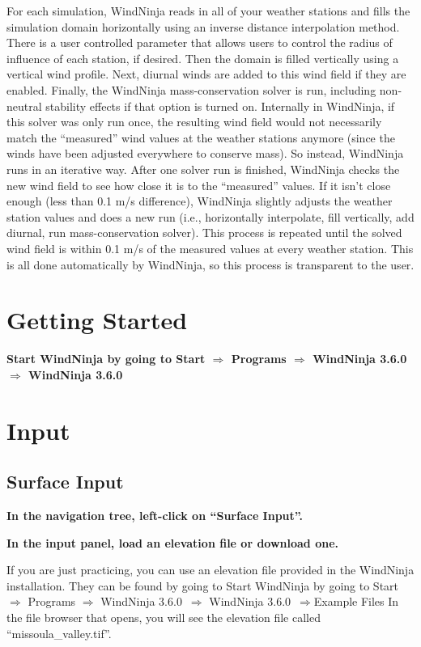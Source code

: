 \documentclass[12pt]{article}
\newcommand\vn{3.6.0}
\begin{document}
For each simulation, WindNinja reads in all of your weather stations and fills the simulation domain horizontally using an inverse distance interpolation method.  There is a user controlled parameter that allows users to control the radius of influence of each station, if desired.  Then the domain is filled vertically using a vertical wind profile.  Next, diurnal winds are added to this wind field if they are enabled.  Finally, the WindNinja mass-conservation solver is run, including non-neutral stability effects if that option is turned on.  Internally in WindNinja, if this solver was only run once, the resulting wind field would not necessarily match the “measured” wind values at the weather stations anymore (since the winds have been adjusted everywhere to conserve mass).  So instead, WindNinja runs in an iterative way.  After one solver run is finished, WindNinja checks the new wind field to see how close it is to the “measured” values.  If it isn't close enough (less than 0.1 m/s difference), WindNinja slightly adjusts the weather station values and does a new run (i.e., horizontally interpolate, fill vertically, add diurnal, run mass-conservation solver).  This process is repeated until the solved wind field is within 0.1 m/s of the measured values at every weather station.  This is all done automatically by WindNinja, so this process is transparent to the user.  

\section{Getting Started}

\textbf{\color{red}Start WindNinja by going to Start $\Rightarrow$ Programs $\Rightarrow$ WindNinja \vn\ $\Rightarrow$ WindNinja \vn\ }

\section{Input}
\subsection{Surface Input}

\textbf{\color{red}In the navigation tree, left-click on “Surface Input”.}

\textbf{\color{red}
In the input panel, load an elevation file or download one.}

If you are just practicing, you can use an elevation file provided in the WindNinja installation.  They can be found by going to Start WindNinja by going to Start $\Rightarrow$ Programs $\Rightarrow$ WindNinja \vn\ $\Rightarrow$ WindNinja \vn\ $\Rightarrow$Example Files  In the file browser that opens, you will see the elevation file called “missoula\_valley.tif”.
\end{document}
